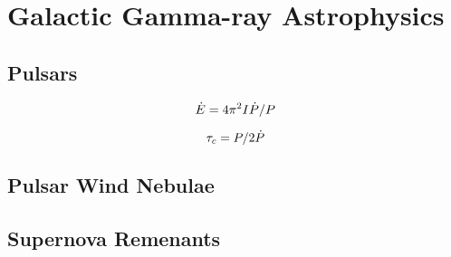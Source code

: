 
\section{Galactic Gamma-ray Astrophysics}
\subsection{Pulsars}

\begin{equation}
  \dot{E} = 
  4\pi^2 I \dot{P}/P
\end{equation}

\begin{equation}
  \tau_c = P/2\dot{P}
\end{equation}


\subsection{Pulsar Wind Nebulae}
\subsection{Supernova Remenants}


